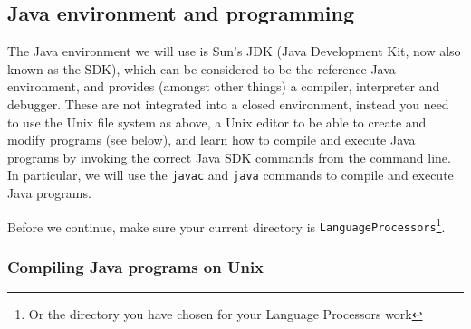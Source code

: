 \documentclass{article}
\begin{document}
\subsection*{Java environment and programming}

The Java environment we will use is Sun's JDK (Java Development Kit, now also known as the SDK), which can be considered to be the reference  Java environment, and provides (amongst other things) a compiler, interpreter and debugger. These are not integrated into a closed environment, instead you need to use the Unix file system as above, a Unix editor to be able to create and modify programs (see below), and learn how to compile and execute Java programs by invoking the correct Java SDK commands from the command line. In particular, we will use the {\tt javac} and {\tt java} commands to compile and execute Java programs.


Before we continue, make sure your current directory is {\tt LanguageProcessors}\footnote{Or the directory you have chosen for your Language Processors work}.

\subsubsection*{Compiling Java programs on Unix}



\end{document}
